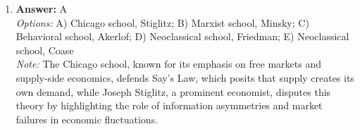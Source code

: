 \documentclass[12pt]{article}
\begin{document}
\begin{enumerate}[label=\arabic*.]
\\ \textit{Note:} The aggregate demand curve represents the total demand for goods and services in an economy at various price levels and is derived from the overall relationships between price levels and total output, rather than simply summing individual product demand curves either horizontally or vertically.
\item \textbf{Answer:} A
\\ \textit{Options:} A) Chicago school, Stiglitz; B) Marxist school, Minsky; C) Behavioral school, Akerlof; D) Neoclassical school, Friedman; E) Neoclassical school, Coase
\\ \textit{Note:} The Chicago school, known for its emphasis on free markets and supply-side economics, defends Say's Law, which posits that supply creates its own demand, while Joseph Stiglitz, a prominent economist, disputes this theory by highlighting the role of information asymmetries and market failures in economic fluctuations.
\end{enumerate}
\end{document}
